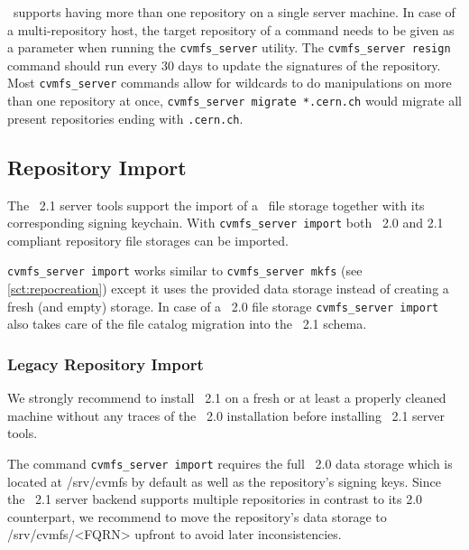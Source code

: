 \cvmfs\ supports having more than one repository on a single server machine.
In case of a multi-repository host, the target repository of a command needs to be given as a parameter when running the \texttt{cvmfs\_server} utility.
The \texttt{cvmfs\_server resign} command should run every 30 days to update the signatures of the repository.
Most \texttt{cvmfs\_server} commands allow for wildcards to do manipulations on more than one repository at once, \eg \texttt{cvmfs\_server migrate *.cern.ch} would migrate all present repositories ending with \texttt{.cern.ch}.

\subsection{Repository Import}
The \cvmfs\ 2.1 server tools support the import of a \cvmfs\ file storage together with its corresponding signing keychain.
With \texttt{cvmfs\_server import} both \cvmfs\ 2.0 and 2.1 compliant repository file storages can be imported.

\texttt{cvmfs\_server import} works similar to \texttt{cvmfs\_server mkfs} (see \ref{sct:repocreation}) except it uses the provided data storage instead of creating a fresh (and empty) storage.
In case of a \cvmfs\ 2.0 file storage \texttt{cvmfs\_server import} also takes care of the file catalog migration into the \cvmfs\ 2.1 schema.

\subsubsection{Legacy Repository Import}
We strongly recommend to install \cvmfs\ 2.1 on a fresh or at least a properly cleaned  machine without any traces of the \cvmfs\ 2.0 installation before installing \cvmfs\ 2.1 server tools.

The command \texttt{cvmfs\_server import} requires the full \cvmfs\ 2.0 data storage which is located at /srv/cvmfs by default as well as the repository's signing keys.
Since the \cvmfs\ 2.1 server backend supports multiple repositories in contrast to its 2.0 counterpart, we recommend to move the repository's data storage to /srv/cvmfs/<FQRN> upfront to avoid later inconsistencies.

